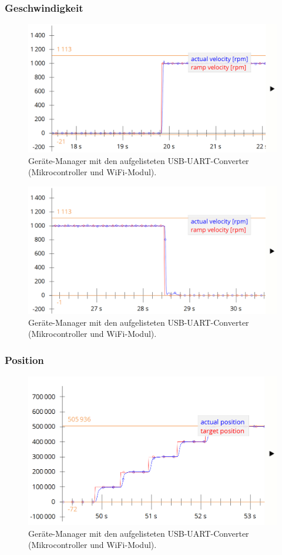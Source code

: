 \subsubsection{Geschwindigkeit}\label{Appendix:PI_Velocity}

\begin{figure}[H]
\center
\includegraphics[width = \textwidth]{graphics/PI_Velocity_Graph_0}
\caption{Geräte-Manager mit den aufgelisteten USB-UART-Converter (Mikrocontroller und WiFi-Modul).}
\label{fig:PI_Velocity_Graph_0}
\end{figure}

\begin{figure}[H]
\center
\includegraphics[width = \textwidth]{graphics/PI_Velocity_Graph_1}
\caption{Geräte-Manager mit den aufgelisteten USB-UART-Converter (Mikrocontroller und WiFi-Modul).}
\label{fig:PI_Velocity_Graph_1}
\end{figure}

\subsubsection{Position}\label{Appendix:PI_Position_0}

\begin{figure}[H]
\center
\includegraphics[width = \textwidth]{graphics/PI_Position_graph_0}
\caption{Geräte-Manager mit den aufgelisteten USB-UART-Converter (Mikrocontroller und WiFi-Modul).}
\label{fig:PI_Position_graph_0}
\end{figure}